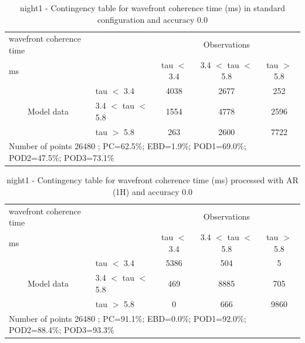\clearpage
\begin{table}[p!]
\begin{center}
\begin{tabular}{llccc}
\hline
{wavefront coherence time}                                       &                                                    & \multicolumn{3}{c}{Observations}                 \\
{ms}                                       &                             & tau $<$ 3.4   & 3.4 $<$ tau $<$ 5.8 & tau $>$ 5.8 \\
\hline
\multicolumn{1}{c}{\multirow{3}{*}{Model data}}  & tau $<$ 3.4             & 4038                & 2677                       & 252              \\
                                                 & 3.4  $<$ tau $<$ 5.8 & 1554                & 4778                       & 2596              \\
                                                 & tau $>$ 5.8             & 263                & 2600                       & 7722              \\
\hline
\multicolumn{5}{l}{ Number of points        26480 ; PC=62.5\%; EBD=1.9\%; POD1=69.0\%; POD2=47.5\%; POD3=73.1\%}
\end{tabular}
\end{center}
\caption{night1 - Contingency table for  wavefront coherence time (ms) in standard configuration and accuracy 0.0}
\label{tab:contingencytauBEF:night1}
\end{table}
\begin{table}[p!]
\begin{center}
\begin{tabular}{llccc}
\hline
{wavefront coherence time}                                       &                                                    & \multicolumn{3}{c}{Observations}                 \\
{ms}                                       &                             & tau $<$ 3.4   & 3.4 $<$ tau $<$ 5.8 & tau $>$ 5.8 \\
\hline
\multicolumn{1}{c}{\multirow{3}{*}{Model data}}  & tau $<$ 3.4             & 5386                & 504                       & 5              \\
                                                 & 3.4  $<$ tau $<$ 5.8 & 469                & 8885                       & 705              \\
                                                 & tau $>$ 5.8             & 0                & 666                       & 9860              \\
\hline
\multicolumn{5}{l}{ Number of points        26480 ; PC=91.1\%; EBD=0.0\%; POD1=92.0\%; POD2=88.4\%; POD3=93.3\%}
\end{tabular}
\end{center}
\caption{night1 - Contingency table for  wavefront coherence time (ms) processed with AR (1H) and accuracy 0.0}
\label{tab:contingencytauAFT:night1}
\end{table}
